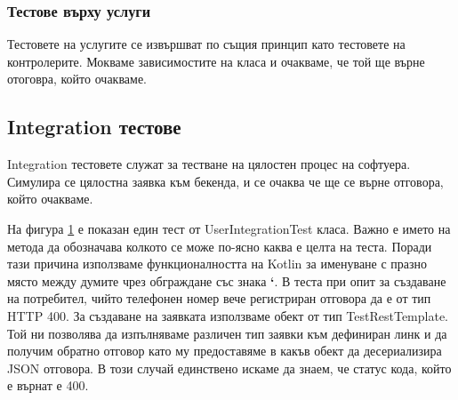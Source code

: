         \subsubsection{Тестове върху услуги}
        Тестовете на услугите се извършват по същия принцип като тестовете на контролерите. Мокваме зависимостите на класа и очакваме, че той ще върне отоговра, който очакваме.
        
    
    \subsection{Integration тестове}
    Integration тестовете служат за тестване на цялостен процес на софтуера. Симулира се цялостна заявка към бекенда, и се очаква че ще се върне отговора, който очакваме.
    
    \begin{figure}[h]
            \centering
            \caption{}
            \label{fig:user_int_test}
        \end{figure}
        
    На фигура \ref{fig:user_int_test} е показан един тест от UserIntegrationTest класа. Важно е името на метода да обозначава колкото се може по-ясно каква е целта на теста. Поради тази причина използваме функционалността на Kotlin за именуване с празно място между думите чрез обграждане със знака \textbf{`}. В теста при опит за създаване на потребител, чийто телефонен номер вече регистриран отговора да е от тип HTTP 400. За създаване на заявката използваме обект от тип TestRestTemplate. Той ни позволява да изпълняваме различен тип заявки към дефиниран линк и да получим обратно отговор като му предоставяме в какъв обект да десериализира JSON отговора.
    В този случай единствено искаме да знаем, че статус кода, който е върнат е 400.
    